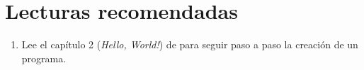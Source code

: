 \section{Lecturas recomendadas}

\begin{enumerate}

\item Lee el capítulo 2 (\emph{Hello, World!}) de \pppbook{}
      para seguir paso a paso la creación de un programa.

\end{enumerate}
